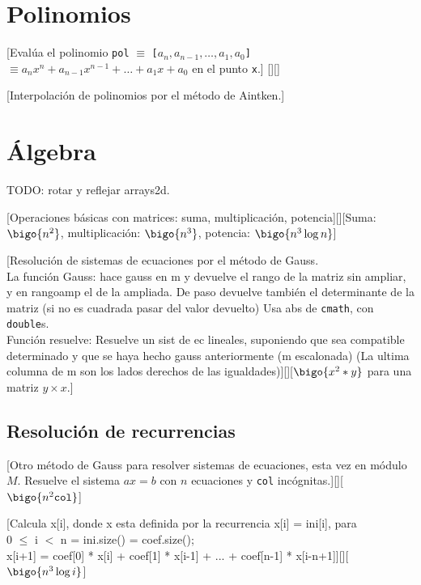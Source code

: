 \section{Polinomios}
	[Evalúa el polinomio \texttt{pol} $\equiv$ \texttt{[$a_n, a_{n-1}, \dots, a_1, a_0$]} $\equiv a_nx^n + a_{n-1}x^{n-1} + \dots + a_1x + a_0$ en el punto \texttt{x}.]%
	[][]
	
	[Interpolación de polinomios por el método de Aintken.]

\section{Álgebra}
TODO: rotar y reflejar arrays2d.

		[Operaciones básicas con matrices: suma, multiplicación, potencia][][Suma: $\bigo{n^{2}}$, multiplicación: $\bigo{n^{3}}$, potencia: $\bigo{n^{3} \log n}$]
	
		[Resolución de sistemas de ecuaciones por el método de Gauss. \\
		La función Gauss: hace gauss en m y devuelve el rango de la matriz sin ampliar, y en rangoamp el de la ampliada. De paso devuelve también el determinante de la matriz (si no es cuadrada pasar del valor devuelto) Usa abs de \texttt{cmath}, con \texttt{double}s. \\ Función resuelve: Resuelve un sist de ec lineales, suponiendo que sea compatible determinado y que se haya hecho gauss anteriormente (m escalonada) (La ultima columna de m son los lados derechos de las igualdades)][][$\bigo{x^{2}*y}$ para una matriz $y \times x$.]
	
\subsection{Resolución de recurrencias}
		[Otro método de Gauss para resolver sistemas de ecuaciones, esta vez en módulo $M$. Resuelve el sistema $ax = b$ con $n$ ecuaciones y \texttt{col} incógnitas.][][$\bigo{n^{2} \texttt{col}}$]

		[Calcula x[i], donde x esta definida por la recurrencia x[i] = ini[i], para \\ 0 $\le$ i $<$ n = ini.size() = coef.size(); \\ x[i+1] = coef[0] * x[i] + coef[1] * x[i-1] + ... + coef[n-1] * x[i-n+1]][][$\bigo{n^3 \log i}$]

